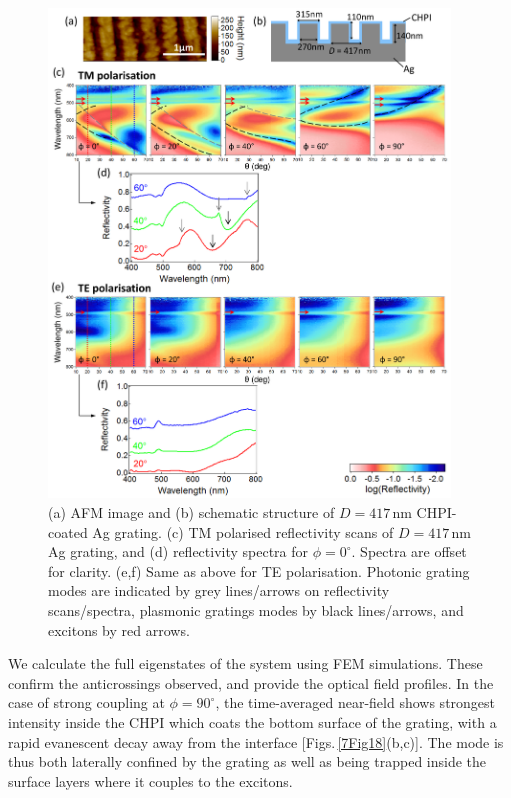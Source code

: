 \begin{figure}[h!] 
\centering    
\includegraphics[width=0.95\textwidth]{Fig17}
\caption[(a) AFM image and (b) schematic structure of $D=417$\,nm CHPI-coated Ag grating. Reflectivity measurements of CHPI-coated Ag grating in (c,d) TM and (e.f) TE polarisation.]{(a) AFM image and (b) schematic structure of $D=417$\,nm CHPI-coated Ag grating. (c) TM polarised reflectivity scans of $D=417$\,nm Ag grating, and (d) reflectivity spectra for $\phi=0^{\circ}$. Spectra are offset for clarity. (e,f) Same as above for TE polarisation. Photonic grating modes are indicated by grey lines/arrows on reflectivity scans/spectra, plasmonic gratings modes by black lines/arrows, and excitons by red arrows.}
\label{7Fig17}
\end{figure}

We calculate the full eigenstates of the system using FEM simulations. These confirm the anticrossings observed, and provide the optical field profiles.
In the case of strong coupling at $\phi=90^{\circ}$, the time-averaged near-field shows strongest intensity inside the CHPI which coats the bottom surface of the grating, with a rapid evanescent decay away from the interface [Figs.\,\ref{7Fig18}(b,c)]. The mode is thus both laterally confined by the grating as well as being trapped inside the surface layers where it couples to the excitons.

